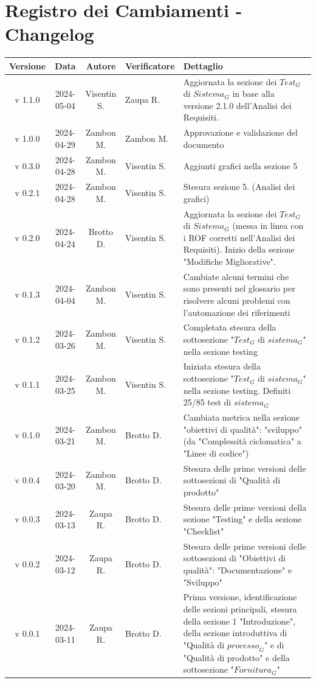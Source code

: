 \documentclass[12pt, oneside]{article}
\begin{document}
\section*{Registro dei Cambiamenti - Changelog}
\begin{tabular}{|c|c|c|p{3cm}|p{6cm}|}
\hline
\textbf{Versione} & \textbf{Data} & \textbf{Autore} & \textbf{Verificatore} & \textbf{Dettaglio} \\
\hline
v 1.1.0 & 2024-05-04 & Visentin S. & Zaupa R. & Aggiornata la sezione dei $\textit{Test}_G$ di $\textit{Sistema}_G$ in base alla versione 2.1.0 dell'Analisi dei Requisiti.\\
\hline
v 1.0.0 & 2024-04-29 & Zambon M. & Zambon M. & Approvazione e validazione del documento\\
\hline
v 0.3.0 & 2024-04-28 & Zambon M. & Visentin S. & Aggiunti grafici nella sezione 5\\
\hline
v 0.2.1 & 2024-04-28 & Zambon M. & Visentin S. & Stesura sezione 5. (Analisi dei grafici)\\
\hline
v 0.2.0 & 2024-04-24 & Brotto D. & Visentin S. & Aggiornata la sezione dei $\textit{Test}_G$ di $\textit{Sistema}_G$ (messa in linea con i ROF corretti nell'Analisi dei Requisiti).
\newline
Inizio della sezione "Modifiche Migliorative".\\
\hline
v 0.1.3 & 2024-04-04 & Zambon M. & Visentin S. & Cambiate alcuni termini che sono presenti nel glossario per risolvere alcuni problemi con l'automazione dei riferimenti\\
\hline
v 0.1.2 & 2024-03-26 & Zambon M. & Visentin S. & Completata stesura della sottosezione "$\textit{Test}_G$ di $\textit{sistema}_G$" nella sezione testing\\
\hline
v 0.1.1 & 2024-03-25 & Zambon M. & Visentin S. & Iniziata stesura della sottosezione "$\textit{Test}_G$ di $\textit{sistema}_G$" nella sezione testing. Definiti 25/85 test di $\textit{sistema}_G$\\
\hline
v 0.1.0 & 2024-03-21 & Zambon M. & Brotto D. & Cambiata metrica nella sezione "obiettivi di qualità": "sviluppo" (da "Complessità ciclomatica" a "Linee di codice")\\
\hline
v 0.0.4 & 2024-03-20 & Zambon M. & Brotto D. & Stesura delle prime versioni delle sottosezioni di "Qualità di prodotto"\\
\hline
v 0.0.3 & 2024-03-13 & Zaupa R. & Brotto D. & Stesura delle prime versioni della sezione "Testing" e della sezione "Checklist"\\
\hline
v 0.0.2 & 2024-03-12 & Zaupa R. & Brotto D. & Stesura delle prime versioni delle sottosezioni di "Obiettivi di qualità": "Documentazione" e "Sviluppo"\\
\hline
v 0.0.1 & 2024-03-11 & Zaupa R. & Brotto D. & Prima versione, identificazione delle sezioni principali, stesura della sezione 1 "Introduzione", della sezione introduttiva di "Qualità di $\textit{processo}_G$" e di "Qualità di prodotto" e della sottosezione "$\textit{Fornitura}_G$" \\
\hline
\end{tabular}
\newpage


\tableofcontents
\newpage

\newpage

\newpage

\newpage

\newpage

\newpage

\end{document}
